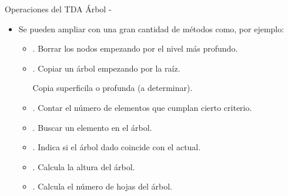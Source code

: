 \documentclass[10pt,envcountsect,spanish]{beamer}
\begin{document}
\begin{frame}[allowframebreaks]{Operaciones del TDA Árbol - }
\begin{itemize}
\begin{itemize}
\item {}. Retorna la altura del nodo .

\item {}. Retorna la posición del nodo raíz del árbol. 

\item {}. Retorna $True$ si la posición  es el nodo raíz del árbol. Retorna $False$ en otro caso.

\item {}. Retorna $True$ si la posición  es el de un nodo interno. Retorna $False$ en otro caso.

\item {}. Retorna $True$ si   es un nodo hoja del árbol. Retorna $False$ en otro caso.

\item {}. Indica si el árbol está vacío o no.
\end{itemize}


\item  Se pueden ampliar con una gran cantidad de métodos como, por ejemplo:

\begin{itemize}
	
\item {}. Borrar los nodos empezando por el nivel más profundo.

\item {}. Copiar un árbol empezando por la raíz.

Copia superficila o profunda (a determinar).

\item {}. Contar el número de elementos que cumplan cierto criterio.

\item {}.   Buscar un elemento en el árbol.

\item {}. Indica si el árbol dado coincide con el actual.

\item {}. Calcula la altura del árbol.

\item {}. Calcula el número de hojas del árbol.

\end{itemize}

\end{itemize}


\end{frame}
\end{document}
